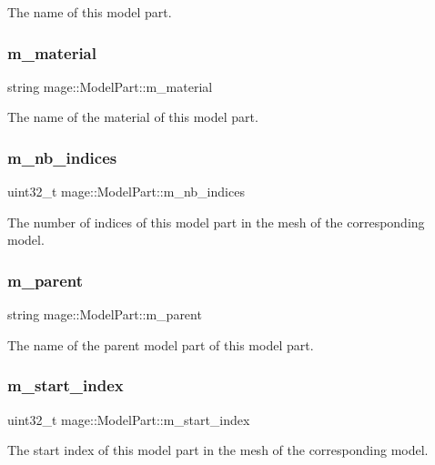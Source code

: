 The name of this model part. \hypertarget{structmage_1_1_model_part_a606603dd01b895cb1aa91b51089bf27f}{}\label{structmage_1_1_model_part_a606603dd01b895cb1aa91b51089bf27f} 
\subsubsection{\texorpdfstring{m\+\_\+material}{m\_material}}
{\footnotesize\ttfamily string mage\+::\+Model\+Part\+::m\+\_\+material}

The name of the material of this model part. \hypertarget{structmage_1_1_model_part_a3944ee7b1bf9a91fd87eefb1cf3c79bc}{}\label{structmage_1_1_model_part_a3944ee7b1bf9a91fd87eefb1cf3c79bc} 
\subsubsection{\texorpdfstring{m\+\_\+nb\+\_\+indices}{m\_nb\_indices}}
{\footnotesize\ttfamily uint32\+\_\+t mage\+::\+Model\+Part\+::m\+\_\+nb\+\_\+indices}

The number of indices of this model part in the mesh of the corresponding model. \hypertarget{structmage_1_1_model_part_ad4754bbb69d28885c09cef591d4d96c5}{}\label{structmage_1_1_model_part_ad4754bbb69d28885c09cef591d4d96c5} 
\subsubsection{\texorpdfstring{m\+\_\+parent}{m\_parent}}
{\footnotesize\ttfamily string mage\+::\+Model\+Part\+::m\+\_\+parent}

The name of the parent model part of this model part. \hypertarget{structmage_1_1_model_part_ac4f520d8284b4af7f20f94b116f7afed}{}\label{structmage_1_1_model_part_ac4f520d8284b4af7f20f94b116f7afed} 
\subsubsection{\texorpdfstring{m\+\_\+start\+\_\+index}{m\_start\_index}}
{\footnotesize\ttfamily uint32\+\_\+t mage\+::\+Model\+Part\+::m\+\_\+start\+\_\+index}

The start index of this model part in the mesh of the corresponding model. 